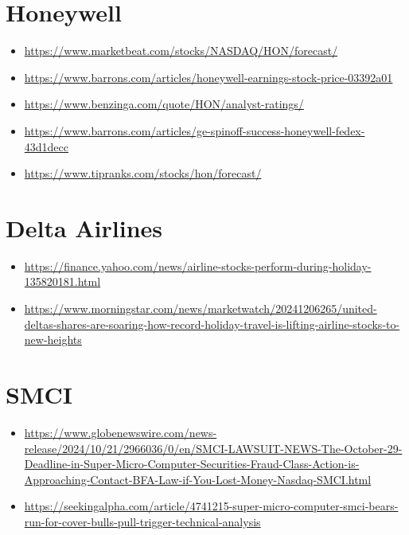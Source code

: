 \documentclass{article}
\begin{document}
\section{Honeywell}%
\begin{itemize}
    \item \url{https://www.marketbeat.com/stocks/NASDAQ/HON/forecast/}
    \item \url{https://www.barrons.com/articles/honeywell-earnings-stock-price-03392a01}
    \item \url{https://www.benzinga.com/quote/HON/analyst-ratings/}
    \item \url{https://www.barrons.com/articles/ge-spinoff-success-honeywell-fedex-43d1decc}
    \item \url{https://www.tipranks.com/stocks/hon/forecast/}
\end{itemize}

\section{Delta Airlines}%
\begin{itemize}
    \item \url{https://finance.yahoo.com/news/airline-stocks-perform-during-holiday-135820181.html}
    \item \url{https://www.morningstar.com/news/marketwatch/20241206265/united-deltas-shares-are-soaring-how-record-holiday-travel-is-lifting-airline-stocks-to-new-heights}
\end{itemize}


\section{SMCI}%
\begin{itemize}
    \item \url{https://www.globenewswire.com/news-release/2024/10/21/2966036/0/en/SMCI-LAWSUIT-NEWS-The-October-29-Deadline-in-Super-Micro-Computer-Securities-Fraud-Class-Action-is-Approaching-Contact-BFA-Law-if-You-Lost-Money-Nasdaq-SMCI.html}
    \item \url{https://seekingalpha.com/article/4741215-super-micro-computer-smci-bears-run-for-cover-bulls-pull-trigger-technical-analysis}
\end{itemize}
\end{document}
